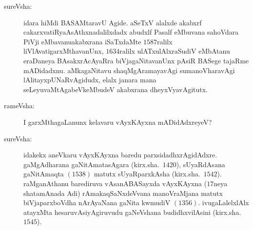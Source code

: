 \begin{description}
\item[sureVsha:] idara hiMdi BASAMtaravU Agide. aSeTxV alalxde akabxrf cakarxvatiRya\break AsAthxnadalilxdadx abudxlf Pasalf eMbuvana sahoVdara PiVji eMbavanu\break akabxrana iSaTxdaMte $1587$ralilx liVlAvatigarxMthavanUnx, $1634$ralilx ulATx\break ulAlxraSudiV eMbAtanu eraDaneya BAsakxrAcAyaRra biVjagaNitavanUnx\- pAsiR BASege tajaRme mADidadxnu. aMkagaNitavu shaqMgAramaya\-vAgi sumanoVharavAgi lAlitayxpUNaRvAgidudx, elalx janara mana seLeyu\break vaMtAgabeVkeMbudeV akabxrana dheyxVyavAgitutx.

\item[rameVsha:] I garxMthagaLanunx kelavaru vAyxKAyxna mADidAdxreyeV?

\item[sureVsha:] idakekx aneVkaru vAyxKAyxna baredu parxsidadhxrAgidAdxre. gaMgAdharana gaNitAmatasAgara (kirx.sha.\ $1420$), sUyaRdAsana gaNitAmaqta $(1538)$ matutx sUyaRparxkAsha (kirx.sha.\ $1542$). raMganAthanu barediruva vAsanABASayxda vAyxKAyxna ($17$neya shatamAnada Adi) rAmakaqSaNxdeVvana manoVraMjana matutx biVjaparxboVdha nArAyaNana gaNita kwmudiV $(1356)$. ivugaLalelxlAlx atayxMta hesaruvAsiyAgiruvudu gaNeVshana budidhxvilAsini (kirx.sha.\ $1545$).
\end{description}

